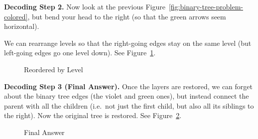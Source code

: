 \documentclass[a4paper,12pt]{article}
\begin{document}
\vspace{5pt}
{\bf Decoding Step 2.} Now look at the previous
Figure~\ref{fig:binary-tree-problem-colored}, but 
bend your head to the right (so that the green arrows seem horizontal).

We can rearrange levels so that the right-going edges stay on the 
same level (but left-going edges go one level down). See Figure~\ref{fig:binary-tree-problem-colored-by-level}.



\begin{figure}[!htb]
\caption{\label{fig:binary-tree-problem-colored-by-level} Reordered by Level}
\end{figure}


\vspace{5pt}
{\bf Decoding Step 3 (Final Answer).} Once the layers are restored, 
we can forget about the binary tree edges (the violet and green ones), 
but instead connect the parent with all the children (i.e.\ 
not just the first child, but also all its siblings to the right). 
Now the original tree is restored. See Figure~\ref{fig:binary-tree-problem-restored}.


\begin{figure}[!htb]
\caption{\label{fig:binary-tree-problem-restored} Final Answer}
\end{figure}
\end{document}
